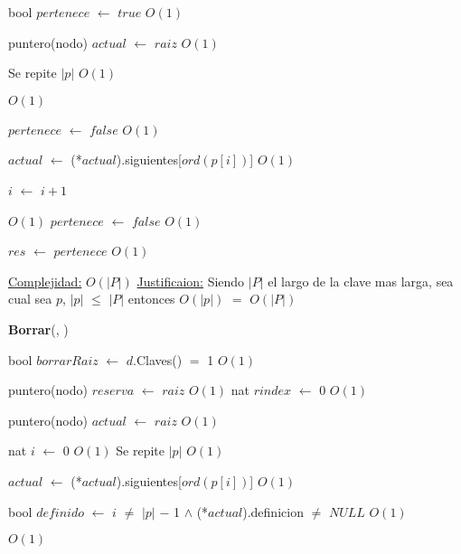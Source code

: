 \begin{Algoritmos}
\begin{algorithm}[H]
\begin{algorithmic}[1]
\State bool $pertenece$ $\gets$ $true$ \Comment $O(1)$

\State puntero(nodo) $actual$ $\gets$ $raiz$ \Comment $O(1)$ 

   \Comment Se repite $|p|$ $O(1)$
		
	
	 \Comment $O(1)$

		\State $pertenece$ $\gets$ $false$ \Comment $O(1)$	 
	
	\EndIf
	
	\State $actual$ $\gets$ (*$actual$).siguientes[$ord(p[i])$] \Comment $O(1)$

	\State $i$ $\gets$ $i + 1$
\EndWhile 

 \Comment $O(1)$ 
	\State $pertenece$ $\gets$ $false$ \Comment $O(1)$
\EndIf

\State $res$ $\gets$ $pertenece$ \Comment $O(1)$ 

\medskip
\State \underline{Complejidad:} $O(|P|)$
\State \underline{Justificaion:} Siendo $|P|$ el largo de la clave mas larga, sea cual sea $p$, $|p|$ $\leq$ $|P|$ entonces 	$O(|p|)$ $=$ $O(|P|)$

\end{algorithmic}
\end{algorithm}



\begin{algorithm}[H]
{\textbf{Borrar}(, })
\begin{algorithmic}[1]

\State bool $borrarRaiz$ $\gets$ $d$.Claves() $=$ 1 \Comment $O(1)$

\State puntero(nodo) $reserva$ $\gets$ $raiz$ \Comment $O(1)$ 
\State nat $rindex$ $\gets$ 0 \Comment $O(1)$

\State puntero(nodo) $actual$ $\gets$ $raiz$ \Comment $O(1)$ 

\State nat $i$ $\gets$ 0 \Comment $O(1)$
   \Comment Se repite $|p|$ $O(1)$
		
	
	
	\State $actual$ $\gets$ (*$actual$).siguientes[$ord(p[i])$] \Comment $O(1)$

	\State bool $definido$ $\gets$ $i$ $\neq$ $|p|$ $-$ 1 $\land$ (*$actual$).definicion $\neq$ $NULL$ \Comment $O(1)$

	 \Comment $O(1)$


\end{algorithmic}
\end{algorithm}
\end{Algoritmos}
